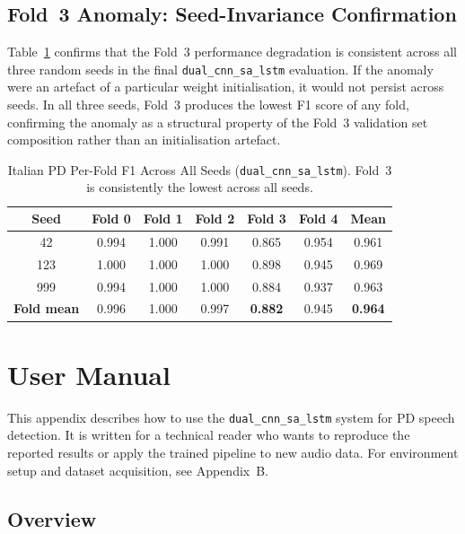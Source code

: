 \documentclass[oneside,openany]{final_report}
\newcommand{\dualcnn}{\texttt{dual\_cnn\_sa\_lstm}}
\begin{document}
\section{Fold~3 Anomaly: Seed-Invariance Confirmation}

Table~\ref{tab:fold3_seed_consistency} confirms that the Fold~3 performance degradation is consistent across all three random seeds in the final \dualcnn{} evaluation. If the anomaly were an artefact of a particular weight initialisation, it would not persist across seeds. In all three seeds, Fold~3 produces the lowest F1 score of any fold, confirming the anomaly as a structural property of the Fold~3 validation set composition rather than an initialisation artefact.

\begin{table}[H]
\centering
\caption{Italian PD Per-Fold F1 Across All Seeds (\dualcnn{}). Fold~3 is consistently the lowest across all seeds.}
\label{tab:fold3_seed_consistency}
\begin{tabular}{c c c c c c c}
\toprule
\textbf{Seed} & \textbf{Fold 0} & \textbf{Fold 1} & \textbf{Fold 2} & \textbf{Fold 3} & \textbf{Fold 4} & \textbf{Mean} \\
\midrule
42  & 0.994 & 1.000 & 0.991 & 0.865 & 0.954 & 0.961 \\
123 & 1.000 & 1.000 & 1.000 & 0.898 & 0.945 & 0.969 \\
999 & 0.994 & 1.000 & 1.000 & 0.884 & 0.937 & 0.963 \\
\midrule
\textbf{Fold mean} & 0.996 & 1.000 & 0.997 & \textbf{0.882} & 0.945 & \textbf{0.964} \\
\bottomrule
\end{tabular}
\end{table}

\chapter{User Manual}
\label{app:usermanual}

This appendix describes how to use the \dualcnn{} system for PD speech detection. It is written for a technical reader who wants to reproduce the reported results or apply the trained pipeline to new audio data. For environment setup and dataset acquisition, see Appendix~B.

\section{Overview}
\end{document}

